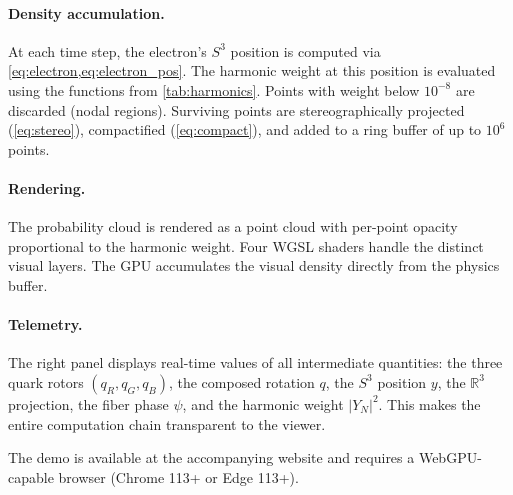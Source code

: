 \documentclass[12pt, a4paper]{article}
\theoremstyle{definition}
\theoremstyle{remark}
\newcommand{\Sthree}{S^3}
\newcommand{\R}{\mathbb{R}}
\begin{document}
\paragraph{Density accumulation.}
At each time step, the electron's $\Sthree$ position is computed via
\cref{eq:electron,eq:electron_pos}. The harmonic weight at this position
is evaluated using the functions from \cref{tab:harmonics}. Points with
weight below $10^{-8}$ are discarded (nodal regions). Surviving points are
stereographically projected (\cref{eq:stereo}), compactified
(\cref{eq:compact}), and added to a ring buffer of up to $10^6$ points.

\paragraph{Rendering.}
The probability cloud is rendered as a point cloud with per-point opacity
proportional to the harmonic weight. Four WGSL shaders handle the distinct
visual layers. The GPU accumulates the visual density directly from the
physics buffer.

\paragraph{Telemetry.}
The right panel displays real-time values of all intermediate quantities:
the three quark rotors $(q_R, q_G, q_B)$, the composed rotation $q$, the
$\Sthree$ position $y$, the $\R^3$ projection, the fiber phase $\psi$, and
the harmonic weight $|Y_N|^2$. This makes the entire computation chain
transparent to the viewer.

The demo is available at the accompanying website and requires a
WebGPU-capable browser (Chrome 113+ or Edge 113+).




\end{document}
